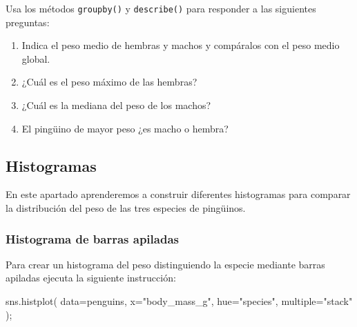 \documentclass[
  a4paper,
  noprof,
  12pt,
  notoc,
  nosols,
  nobib]{mnye}
\newenvironment{Shaded}{\begin{snugshade}}{\end{snugshade}}
\newcommand{\NormalTok}[1]{\textcolor[rgb]{0.00,0.23,0.31}{#1}}
\newcommand{\OperatorTok}[1]{\textcolor[rgb]{0.37,0.37,0.37}{#1}}
\newcommand{\StringTok}[1]{\textcolor[rgb]{0.13,0.47,0.30}{#1}}
\providecommand{\tightlist}{%
  \setlength{\itemsep}{0pt}\setlength{\parskip}{0pt}}\usepackage{longtable,booktabs,array}
\renewenvironment{exercise}[1][]{
            \if\relax\detokenize{#1}\relax
                \ex
            \else
                \ex[note={#1}]
            \fi
        }{\endex}
\theoremstyle{definition}
\newtheorem{exercise}{Ejercicio}[section]
\theoremstyle{remark}
\begin{document}
\begin{exercise}[]%
\protect\hypertarget{exr-numerical_by_categorical-describe}{}\label{exr-numerical_by_categorical-describe}%
Usa los métodos \texttt{groupby()} y \texttt{describe()} para responder
a las siguientes preguntas:

\begin{enumerate}
\def\labelenumi{\alph{enumi}.}
\tightlist
\item
  Indica el peso medio de hembras y machos y compáralos con el peso
  medio global.
\item
  ¿Cuál es el peso máximo de las hembras?
\item
  ¿Cuál es la mediana del peso de los machos?
\item
  El pingüino de mayor peso ¿es macho o hembra?
\end{enumerate}

\end{exercise}

\hypertarget{histogramas}{%
\subsection{Histogramas}\label{histogramas}}

En este apartado aprenderemos a construir diferentes histogramas para
comparar la distribución del peso de las tres especies de pingüinos.

\hypertarget{histograma-de-barras-apiladas}{%
\subsubsection{Histograma de barras
apiladas}\label{histograma-de-barras-apiladas}}

Para crear un histograma del peso distinguiendo la especie mediante
barras apiladas ejecuta la siguiente instrucción:

\begin{Shaded}
\begin{Highlighting}[]
\NormalTok{sns.histplot(}
\NormalTok{    data}\OperatorTok{=}\NormalTok{penguins, }
\NormalTok{    x}\OperatorTok{=}\StringTok{"body\_mass\_g"}\NormalTok{, }
\NormalTok{    hue}\OperatorTok{=}\StringTok{"species"}\NormalTok{,}
\NormalTok{    multiple}\OperatorTok{=}\StringTok{"stack"}
\NormalTok{)}\OperatorTok{;}
\end{Highlighting}
\end{Shaded}
\end{document}
